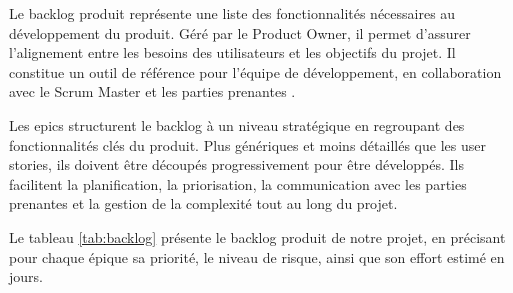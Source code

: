 Le backlog produit représente une liste des fonctionnalités nécessaires au développement du produit. Géré par le Product Owner, il permet d'assurer l’alignement entre les besoins des utilisateurs et les objectifs du projet. Il constitue un outil de référence pour l’équipe de développement, en collaboration avec le Scrum Master et les parties prenantes \cite{backlog}.

Les epics structurent le backlog à un niveau stratégique en regroupant des fonctionnalités clés du produit. Plus génériques et moins détaillés que les user stories, ils doivent être découpés progressivement pour être développés. Ils facilitent la planification, la priorisation, la communication avec les parties prenantes et la gestion de la complexité tout au long du projet\cite{epic}.

Le tableau \ref{tab:backlog} présente le backlog produit de notre projet, en précisant pour chaque épique sa priorité, le niveau de risque, ainsi que son effort estimé en jours.
\renewcommand{\arraystretch}{1.3}
